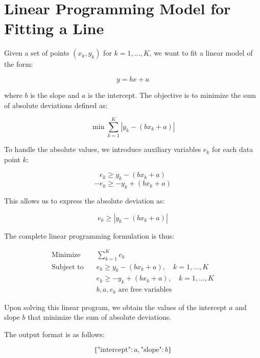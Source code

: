 \documentclass{article}
\begin{document}
\section*{Linear Programming Model for Fitting a Line}

Given a set of points \((x_k, y_k)\) for \(k = 1, \ldots, K\), we want to fit a linear model of the form:

\[
y = bx + a
\]

where \(b\) is the slope and \(a\) is the intercept. The objective is to minimize the sum of absolute deviations defined as:

\[
\min \sum_{k=1}^{K} |y_k - (bx_k + a)|
\]

To handle the absolute values, we introduce auxiliary variables \(e_k\) for each data point \(k\):

\[
e_k \geq y_k - (bx_k + a)
\]
\[
-e_k \geq -y_k + (bx_k + a)
\]

This allows us to express the absolute deviation as:

\[
e_k \geq |y_k - (bx_k + a)|
\]

The complete linear programming formulation is thus:

\begin{align*}
\text{Minimize} \quad & \sum_{k=1}^{K} e_k \\
\text{Subject to} \quad & e_k \geq y_k - (bx_k + a), \quad k = 1, \ldots, K \\
& e_k \geq -y_k + (bx_k + a), \quad k = 1, \ldots, K \\
& b, a, e_k \text{ are free variables}
\end{align*}

Upon solving this linear program, we obtain the values of the intercept \(a\) and slope \(b\) that minimize the sum of absolute deviations.

The output format is as follows:

\[
\{
    \text{"intercept"}: a,
    \text{"slope"}: b
\}
\]
\end{document}
